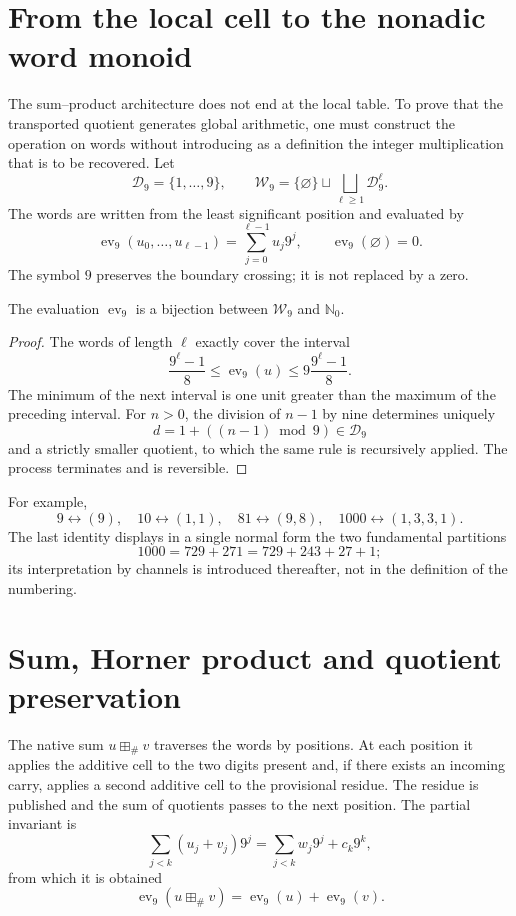\ifdefined\HMTTPKWordArithmetic
\section{From the local cell to the nonadic word monoid}

The sum--product architecture does not end at the local table. To prove that
the transported quotient generates global arithmetic, one must construct the
operation on words without introducing as a definition the integer multiplication
that is to be recovered. Let
\[
 \mathcal D_9=\{1,\ldots,9\},\qquad
 \mathcal W_9=\{\varnothing\}\sqcup
 \bigsqcup_{\ell\geq1}\mathcal D_9^\ell .
\]
The words are written from the least significant position and evaluated
by
\[
 \operatorname{ev}_9(u_0,\ldots,u_{\ell-1})
 =\sum_{j=0}^{\ell-1}u_j9^j,\qquad
 \operatorname{ev}_9(\varnothing)=0.
\]
The symbol \(9\) preserves the boundary crossing; it is not replaced by a zero.

\begin{theorem}
The evaluation \(\operatorname{ev}_9\) is a bijection between
\(\mathcal W_9\) and \(\mathbb N_0\).
\end{theorem}
\begin{proof}
The words of length \(\ell\) exactly cover the interval
\[
 \frac{9^\ell-1}{8}
 \leq\operatorname{ev}_9(u)
 \leq9\frac{9^\ell-1}{8}.
\]
The minimum of the next interval is one unit greater than the maximum of the
preceding interval. For \(n>0\), the division of \(n-1\) by nine determines uniquely
\[
 d=1+((n-1)\bmod9)\in\mathcal D_9
\]
and a strictly smaller quotient, to which the same rule is recursively
applied. The process terminates and is reversible.
\end{proof}
For example,
\[
 9\leftrightarrow(9),\quad
 10\leftrightarrow(1,1),\quad
 81\leftrightarrow(9,8),\quad
 1000\leftrightarrow(1,3,3,1).
\]
The last identity displays in a single normal form the two fundamental
partitions
\[
 1000=729+271=729+243+27+1;
\]
its interpretation by channels is introduced thereafter, not in the definition
of the numbering.

\section{Sum, Horner product and quotient preservation}

The native sum \(u\boxplus_\#v\) traverses the words by positions. At each
position it applies the additive cell to the two digits present and, if there exists
an incoming carry, applies a second additive cell to the provisional residue. The
residue is published and the sum of quotients passes to the next position. The
partial invariant is
\[
 \sum_{j<k}(u_j+v_j)9^j
 =\sum_{j<k}w_j9^j+c_k9^k,
\]
from which it is obtained
\[
 \operatorname{ev}_9(u\boxplus_\#v)
 =\operatorname{ev}_9(u)+\operatorname{ev}_9(v).
\]

